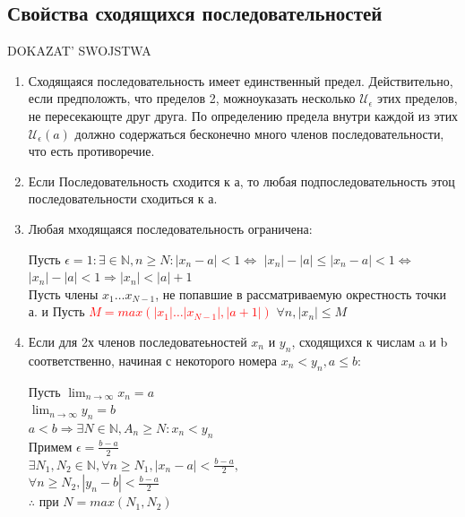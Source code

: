 \documentclass[oneside]{book}
\begin{document}
\begin{enumerate}
\section[Свойства]{Свойства сходящихся последовательностей}
{\LARGE{DOKAZAT' SWOJSTWA}}
\begin{enumerate}
    \item Сходящаяся последовательность имеет единственный предел. Действительно, если предположть,
          что пределов 2, можноуказать несколько $\mathcal{U}_\epsilon$ этих пределов, не пересекающте
          друг друга. По определению предела внутри каждой из этих  $\mathcal{U}_\epsilon(a)$ должно
          содержаться бесконечно много членов последовательности, что есть противоречие.
    \item Если Последовательность сходится к а, то любая подпоследовательность этоц последовательности сходиться к а.
    \item Любая мходящаяся последовательность ограничена: \begin{center}
        Пусть $\epsilon = 1: \exists \in \mathbb{N}, n \geq N: |x_n - a| < 1 \Leftrightarrow$
        $|x_n| - |a| \leq |x_n - a| < 1 \Leftrightarrow$ \\
        $|x_n| - |a| < 1 \Rightarrow |x_n| < |a| + 1$ \\
        Пусть члены $x_1 \dots x_{N-1}$, не попавшие в рассматриваемую окрестность точки а. и Пусть
        \textcolor{red}{$M = max(|x_1| \dots |x_{N-1}|, |a+1|)$} $\forall n, |x_n| \leq M$
        \end{center}
    \item Если для 2х членов последоватеьностей ${x_n}$ и ${y_n}$, сходящихся к числам a и b
          соответственно, начиная с некоторого номера $ x_n < y_n, a \leq b$: \begin{center}
                Пусть $\lim_{n \rightarrow \infty}{x_n = a}$ \\$\lim_{n \rightarrow \infty}{y_n = b}$ \\
                $a < b \Rightarrow \exists N \in \mathbb{N}, A_n \geq N: x_n < y_n$ \\
                Примем $\epsilon = \frac{b-a}{2}$ \\
                $\exists N_1, N_2 \in \mathbb{N}, \forall n \geq N_1, |x_n - a| < \frac{b-a}{2},$ \\
                                                  $\forall n \geq N_2, |y_n - b| < \frac{b-a}{2}$ \\
            $\therefore$ при $N = max(N_1, N_2)$ \\

\end{center}
\end{enumerate}
\end{enumerate}
\end{document}
